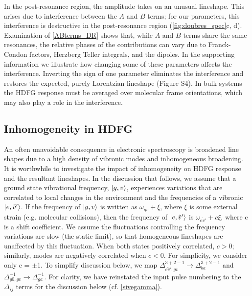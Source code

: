 \documentclass[aip, jcp, reprint, onecolumn, nofootinbib]{revtex4-2}
\begin{document}
In the post-resonance region, the amplitude takes on an unusual lineshape.
This arises due to interference between the $A$ and $B$ terms; for our parameters, this interference is destructive in the post-resonance region (\autoref{fig:doubres_spec}c, d).
Examination of \autoref{ABterms_DR} shows that, while $A$ and $B$ terms share the same resonances, the relative phases of the contributions can vary due to Franck-Condon factors, Herzberg Teller integrals, and the dipoles. 
In the supporting information we illustrate how changing some of these parameters affects the interference.
Inverting the sign of one parameter eliminates the interference and restores the expected, purely Lorentzian lineshape (Figure S4).
In bulk systems the HDFG response must be averaged over molecular frame orientations, which may also play a role in the interference.

\subsection{Inhomogeneity in HDFG}

An often unavoidable consequence in electronic spectroscopy is broadened line shapes due to a high density of vibronic modes and inhomogeneous broadening.
It is worthwhile to investigate the impact of inhomogeneity on HDFG response and the resultant lineshapes. 
In the discussion that follows, we assume that a ground state vibrational frequency, $\ket{g,v}$, experiences variations that are correlated to local changes in the environment and the frequencies of a vibronic $\ket{e,\tilde{v}'}$.
If the frequency of $\ket{g,v}$ is written as $\omega_{gv} + \xi$, where $\xi$ is some external strain (e.g. molecular collisions), then the frequency of $\ket{e,\tilde{v}'}$ is $\omega_{e\tilde{v}'} + c\xi$, where c is a shift coefficient.
We assume the fluctuations controlling the frequency variations are slow (the static limit), so that homogeneous lineshapes are unaffected by this fluctuation. 
When both states positively correlated, $c > 0$; similarly, modes are negatively correlated when $c < 0$.
For simplicity, we consider only c = $\pm$1.
To simplify discussion below, we map $\Delta^{3+2-1}_{e\tilde{v}', gv} \rightarrow \Delta^{3+2-1}_{ba}$ and $\Delta^{-1}_{g0,gv} \rightarrow \Delta^{-1}_{ga}$.
For clarity, we have reinstated the input pulse numbering to the $\Delta_{ij}$ terms for the discussion below (cf. \autoref{sivegamma}).
\end{document}
